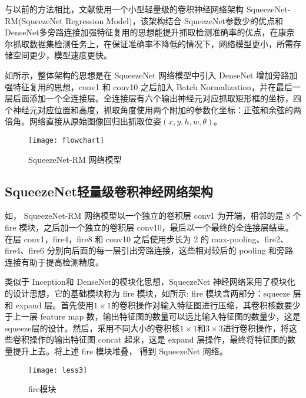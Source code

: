 与以前的方法相比，文献\cite{bib:one}使用一个小型轻量级的卷积神经网络架构 SqueezeNet-RM(SqueezeNet Regression Model)，该架构结合 SqueezeNet参数少的优点和 DenseNet多旁路连接加强特征复用的思想能提升抓取检测准确率的优点，在康奈尔抓取数据集检测任务上，在保证准确率不降低的情况下，网络模型更小，所需存储空间更少，模型速度更快。

如所示，整体架构的思想是在 SqueezeNet 网络模型中引入 DenseNet 增加旁路加强特征复用的思想，conv1 和 conv10 之后加入 Batch Normalization，并在最后一层后面添加一个全连接层。全连接层有六个输出神经元对应抓取矩形框的坐标，四个神经元对应位置和高度，抓取角度使用两个附加的参数化坐标：正弦和余弦的两倍角。网络直接从原始图像回归出抓取位姿$(x,y,h,w,\theta)$。

\begin{figure}[!htbp]
	\centering
	\texttt{[image: flowchart]}
	\caption{SqueezeNet-RM 网络模型}
     \label{figflowchart}
\end{figure}

\subsection{SqueezeNet轻量级卷积神经网络架构}

如， SqueezeNet-RM 网络模型以一个独立的卷积层 conv1 为开端，相邻的是 8 个 f\/ire 模块，之后加一个独立的卷积层 conv10，最后以一个最终的全连接层结束。在层 conv1，f\/ire4，f\/ire8 和 conv10 之后使用步长为 2 的 max-pooling、f\/ire2、f\/ire4、f\/ire6 分别向后面的每一层引出旁路连接，这些相对较后的 pooling 和旁路连接有助于提高检测精度。 

类似于 Inception和 DenseNet的模块化思想，SqueezeNet 神经网络采用了模块化的设计思想，它的基础模块称为 f\/ire 模块，如所示:  f\/ire 模块含两部分：squeeze 层和 expand 层。首先使用$1\times1$的卷积操作对输入特征图进行压缩，其卷积核数要少于上一层 feature map 数，输出特征图的数量可以远比输入特征图的数量少，这是 squeeze层的设计。然后，采用不同大小的卷积核$1\times1$和$3\times3$进行卷积操作，将这些卷积操作的输出特征图 concat 起来，这是 expand 层操作，最终将特征图的数量提升上去。将上述 f\/ire 模块堆叠， 得到 SqueezeNet 网络。

\begin{figure}[!htbp]
	\centering
	\texttt{[image: less3]}
	\caption{f\/ire模块}
     \label{figfire}
\end{figure}

